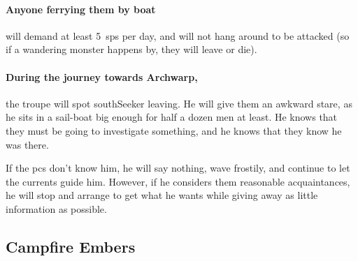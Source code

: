 \begin{multicols}{2}
\paragraph{Anyone ferrying them by boat}
will demand at least 5~\glspl{sp} per day, and will not hang around to be attacked (so if a wandering monster happens by, they will leave or die).

\paragraph{During the journey towards Archwarp,}
the troupe will spot \gls{southSeeker} leaving.
He will give them an awkward stare, as he sits in a sail-boat big enough for half a dozen men at least.
He knows that they must be going to investigate something, and he knows that they know he was there.

If the \glspl{pc} don't know him, he will say nothing, wave frostily, and continue to let the currents guide him.
However, if he considers them reasonable acquaintances, he will stop and arrange to get what he wants while giving away as little information as possible.

\southSeeker

\subsection{Campfire Embers}


\end{multicols}
